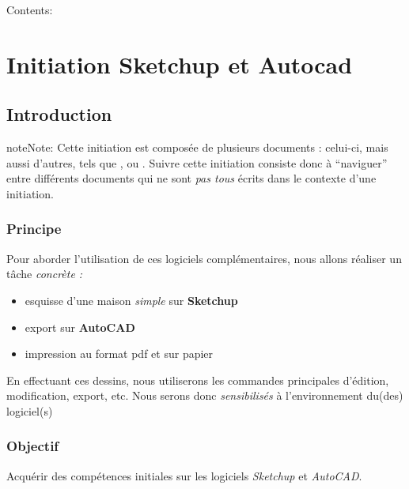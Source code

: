 \documentclass[a4paper,12pt,french]{sphinxmanual}
\begin{document}
Contents:


\chapter{Initiation Sketchup et Autocad}
\label{init_su+acad/index:initiation-sketchup-et-autocad}\label{init_su+acad/index:index-init-su-acad}\label{init_su+acad/index::doc}\label{init_su+acad/index:documentation-canopee}

\section{Introduction}
\label{init_su+acad/001_intro:introduction}\label{init_su+acad/001_intro::doc}
\begin{notice}{note}{Note:}
Cette initiation est composée de plusieurs documents : celui-ci, mais aussi d'autres, tels que {\hyperref[su/config\string-su::doc]{}}, ou {\hyperref[acad/config_acad::doc]{}} . Suivre cette initiation consiste donc à ``naviguer'' entre différents documents qui ne sont \emph{pas tous} écrits dans le contexte d'une initiation.
\end{notice}


\subsection{Principe}
\label{init_su+acad/001_intro:principe}
Pour aborder l'utilisation de ces logiciels complémentaires, nous allons
réaliser un tâche \emph{concrète :}
\begin{itemize}
\item {} 
esquisse d'une maison \emph{simple} sur \textbf{Sketchup}

\item {} 
export sur \textbf{AutoCAD}

\item {} 
impression au format pdf et sur papier

\end{itemize}

En effectuant ces dessins, nous utiliserons les commandes principales
d'édition, modification, export, etc. Nous serons donc \emph{sensibilisés} à
l'environnement du(des) logiciel(s)


\subsection{Objectif}
\label{init_su+acad/001_intro:objectif}
Acquérir des compétences initiales sur les logiciels  \emph{Sketchup} et \emph{AutoCAD}.
\end{document}
